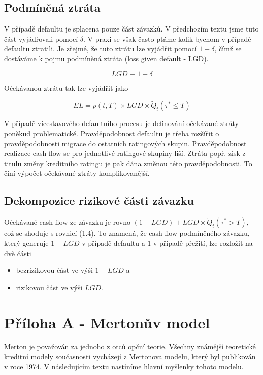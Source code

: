 \subsection{Podmíněná ztráta}

V případě defaultu je splacena pouze část závazků. V předchozím textu jsme tuto část vyjádřovali pomocí $\delta$. V praxi se však často ptáme kolik bychom v případě defaultu ztratili. Je zřejmé, že tuto ztrátu lze vyjádřit pomocí $1 - \delta$, čímž se dostáváme k pojmu podmíněná ztráta (loss given default - LGD).

\begin{equation}
LGD \equiv 1 - \delta
\end{equation}

Očekávanou ztrátu tak lze vyjádřit jako

\begin{equation}
EL = p(t, T) \times LGD \times \tilde{Q}_t(\tau^* \le T)
\end{equation}

V případě vícestavového defaultního procesu je definování očekávané ztráty poněkud problematické. Pravděpodobnost defaultu je třeba rozšířit o pravděpodobnosti migrace do ostatních ratingových skupin. Pravděpodobnost realizace cash-flow se pro jednotlivé ratingové skupiny liší. Ztráta popř. zisk z titulu změny kreditního ratingu je pak dána změnou této pravděpodobnosti. To činí výpočet očekávané ztráty komplikovanější.

\subsection{Dekompozice rizikové části závazku}

Očekávané cash-flow ze závazku je rovno $(1 - LGD) + LGD \times \tilde{Q}_t(\tau^* > T)$, což se shoduje s rovnicí (1.4). To znamená, že cash-flow podmíněného závazku, který generuje $1 - LGD$ v případě defaultu a $1$ v případě přežití, lze rozložit na dvě části
\begin{itemize}
\item bezrizikovou část ve výši $1 - LGD$ a
\item rizikovou část ve výši $LGD$.
\end{itemize}

\section{Příloha A - Mertonův model}

Merton je považován za jednoho z otců opční teorie. Všechny známější teoretické kreditní modely současnosti vycházejí z Mertonova modelu, který byl publikován v roce 1974. V následujícím textu nastíníme hlavní myšlenky tohoto modelu.

